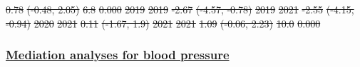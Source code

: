\documentclass[
  letterpaper,
  DIV=11,
  numbers=noendperiod]{scrartcl}
\providecommand{\DIFadd}[1]{{\protect\color{blue}\underline{#1}}} %
\providecommand{\DIFdel}[1]{{\protect\color{red}\sout{#1}}}                      %
\providecommand{\DIFaddbegin}{} %
\providecommand{\DIFaddend}{} %
\providecommand{\DIFdelbegin}{} %
\providecommand{\DIFdelend}{} %
\providecommand{\DIFdelFL}[1]{\DIFdel{#1}} %
\newcommand{\DIFscaledelfig}{0.5}
\newlength{\DIFdelgraphicswidth} %
\newlength{\DIFdelgraphicsheight} %
\newcommand{\DIFaddincludegraphics}[2][]{{\color{blue}\fbox{\DIFOincludegraphics[#1]{#2}}}} %
\newcommand{\DIFdelincludegraphics}[2][]{%
\sbox{\DIFdelgraphicsbox}{\DIFOincludegraphics[#1]{#2}}%
\settoboxwidth{\DIFdelgraphicswidth}{\DIFdelgraphicsbox} %
\settoboxtotalheight{\DIFdelgraphicsheight}{\DIFdelgraphicsbox} %
\scalebox{\DIFscaledelfig}{%
\parbox[b]{\DIFdelgraphicswidth}{\usebox{\DIFdelgraphicsbox}\\[-\baselineskip] \rule{\DIFdelgraphicswidth}{0em}}\llap{\resizebox{\DIFdelgraphicswidth}{\DIFdelgraphicsheight}{%
\setlength{\unitlength}{\DIFdelgraphicswidth}%
\begin{picture}(1,1)%
\thicklines\linethickness{2pt} %
{\color[rgb]{1,0,0}\put(0,0){\framebox(1,1){}}}%
{\color[rgb]{1,0,0}\put(0,0){\line( 1,1){1}}}%
{\color[rgb]{1,0,0}\put(0,1){\line(1,-1){1}}}%
\end{picture}%
}\hspace*{3pt}}} %
} %
\DeclareRobustCommand{\DIFaddbegin}{\DIFOaddbegin \let\includegraphics\DIFaddincludegraphics} %
\DeclareRobustCommand{\DIFaddend}{\DIFOaddend \let\includegraphics\DIFOincludegraphics} %
\DeclareRobustCommand{\DIFdelbegin}{\DIFOdelbegin \let\includegraphics\DIFdelincludegraphics} %
\DeclareRobustCommand{\DIFdelend}{\DIFOaddend \let\includegraphics\DIFOincludegraphics} %
\begin{document}
\DIFdelFL{0.78 }%
\DIFdelFL{(-0.48, 2.05) }%
\DIFdelFL{6.8 }%
\DIFdelFL{0.000}%
\DIFdelFL{\hspace{1em}2019 }%
\DIFdelFL{2019 }%
\DIFdelFL{-2.67 }%
\DIFdelFL{(-4.57, -0.78) }%
\DIFdelFL{\hspace{1em}2019 }%
\DIFdelFL{2021 }%
\DIFdelFL{-2.55 }%
\DIFdelFL{(-4.15, -0.94) }%
\DIFdelFL{\hspace{1em}2020 }%
\DIFdelFL{2021 }%
\DIFdelFL{0.11 }%
\DIFdelFL{(-1.67, 1.9) }%
\DIFdelFL{\hspace{1em}2021 }%
\DIFdelFL{2021 }%
\DIFdelFL{1.09 }%
\DIFdelFL{(-0.06, 2.23) }%
\DIFdelFL{10.0 }%
\DIFdelFL{0.000}%

\DIFdelend \newpage

\DIFdelbegin %
\DIFdelend \DIFaddbegin \subsubsection{\DIFadd{Mediation analyses for blood
pressure}}\label{mediation-analyses-for-blood-pressure}
\DIFaddend 
\end{document}
